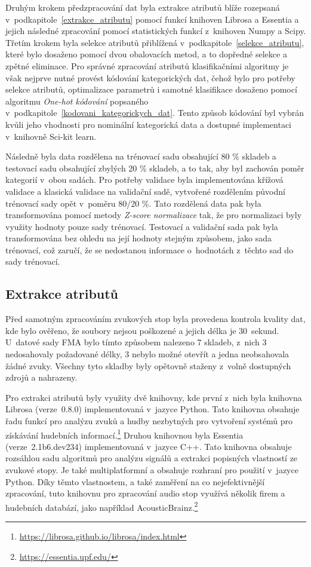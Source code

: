 Druhým krokem předzpracování dat byla extrakce atributů blíže rozepsaná v~podkapitole~\ref{extrakce_atributu} pomocí funkcí knihoven Librosa a Essentia a jejich následné zpracování pomocí statistických funkcí z~knihoven Numpy a Scipy. Třetím krokem byla selekce atributů přiblížená v~podkapitole~\ref{selekce_atributu}, které bylo dosaženo pomocí dvou obalovacích metod, a to dopředné selekce a zpětné eliminace. Pro správné zpracování atributů klasifikačními algoritmy je však nejprve nutné provést kódování kategorických dat, čehož bylo pro potřeby selekce atributů, optimalizace parametrů i samotné klasifikace dosaženo pomocí algoritmu \textit{One-hot kódování} popsaného v~podkapitole~\ref{kodovani_kategorickych_dat}. Tento způsob kódování byl vybrán kvůli jeho vhodnosti pro nominální kategorická data a dostupné implementaci v~knihovně Sci-kit learn.

Následně byla data rozdělena na trénovací sadu obsahující 80 \% skladeb a testovací sadu obsahující zbylých 20 \% skladeb, a to tak, aby byl zachován poměr kategorií v~obou sadách. Pro potřeby validace byla implementována křížová validace a klasická validace na validační sadě, vytvořené rozdělením původní trénovací sady opět v~poměru 80/20 \%. Tato rozdělená data pak byla transformována pomocí metody \textit{Z-score normalizace} tak, že pro normalizaci byly využity hodnoty pouze sady trénovací. Testovací a validační sada pak byla transformována bez ohledu na její hodnoty stejným způsobem, jako sada trénovací, což zaručí, že se nedostanou informace o~hodnotách z~těchto sad do sady trénovací. 

\subsection*{Extrakce atributů}
\label{NIS_extrakce_atributu}
Před samotným zpracováním zvukových stop byla provedena kontrola kvality dat, kde bylo ověřeno, že soubory nejsou poškozené a jejich délka je 30~sekund. U~datové sady FMA bylo tímto způsobem nalezeno 7 skladeb, z~nich 3 nedosahovaly požadované délky, 3 nebylo možné otevřít a jedna neobsahovala žádné zvuky. Všechny tyto skladby byly opětovně staženy z~volně dostupných zdrojů a nahrazeny.

Pro extrakci atributů byly využity dvě knihovny, kde první z~nich byla knihovna Librosa (verze~0.8.0) implementovaná v~jazyce Python. Tato knihovna obsahuje řadu funkcí pro analýzu zvuků a hudby nezbytných pro vytvoření systémů pro získávání hudebních informací.\footnote{\url{https://librosa.github.io/librosa/index.html}} Druhou knihovnou byla Essentia (verze~2.1b6.dev234) implementovaná v~jazyce C++. Tato knihovna obsahuje rozsáhlou sadu algoritmů pro analýzu signálů a extrakci popisných vlastností ze zvukové stopy. Je také multiplatformní a obsahuje rozhraní pro použití v~jazyce Python. Díky těmto vlastnostem, a také zaměření na co nejefektivnější zpracování, tuto knihovnu pro zpracování audio stop využívá několik firem a hudebních databází, jako například AcousticBrainz.\footnote{\url{https://essentia.upf.edu/}}

